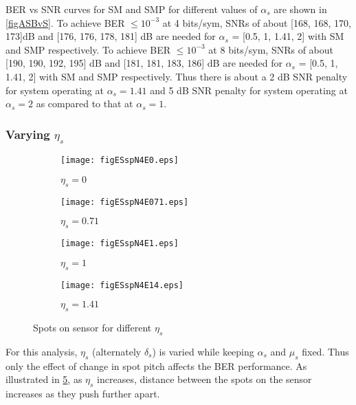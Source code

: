 BER vs SNR curves for SM and SMP for different values of $\alpha_{s}$ are shown in \figurename{ \ref{figASBvS}}. To achieve BER $\leq10^{-3}$ at 4 bits/sym, SNRs of about [168, 168, 170, 173]dB and [176, 176, 178, 181] dB are needed for $\alpha_{s}$ = [0.5, 1, 1.41, 2]  with SM and SMP respectively. To achieve BER $\leq10^{-3}$ at 8 bits/sym, SNRs of about [190, 190, 192, 195] dB and [181, 181, 183, 186] dB are needed for $\alpha_{s}$ = [0.5, 1, 1.41, 2] with SM and SMP respectively. Thus there is about a 2 dB SNR penalty for system operating at $\alpha_{s}=1.41$ and 5 dB SNR penalty for system operating at $\alpha_{s}=2$ as compared to that at $\alpha_{s}=1$.

\subsubsection{Varying $\eta_{s}$}
\label{subsubsec:osmResultsEta}
\begin{figure}[!t]
	\centering
		\begin{subfigure}{0.49\textwidth}
			\centering
			\texttt{[image: figESspN4E0.eps]}
			\caption{$\eta_{s}=0$}
			\label{figESspN4E0}
		\end{subfigure}
		\hfill
		\begin{subfigure}{0.49\textwidth}
			\centering
			\texttt{[image: figESspN4E071.eps]}
			\caption{$\eta_{s}=0.71$}
			\label{figESspN4E071}
		\end{subfigure}
		\vfill
		\begin{subfigure}{0.49\textwidth}
			\centering
			\texttt{[image: figESspN4E1.eps]}
			\caption{$\eta_{s}=1$}
			\label{figESspN4E1}
		\end{subfigure}
		\hfill
		\begin{subfigure}{0.49\textwidth}
			\centering
			\texttt{[image: figESspN4E14.eps]}
			\caption{$\eta_{s}=1.41$}
			\label{figESspN4E14}
		\end{subfigure}
		
		\caption{Spots on sensor for different $\eta_{s}$}
		\label{figESSpots}
\end{figure}

For this analysis, $\eta_{s}$ (alternately $\delta_{s}$) is varied while keeping $\alpha_{s}$ and $\mu_{s}$ fixed. Thus only the effect of change in spot pitch affects the BER performance. As illustrated in \figurename{ \ref{figESSpots}}, as $\eta_{s}$ increases, distance between the spots on the sensor increases as they push further apart.

